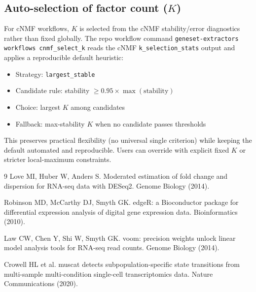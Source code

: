 \documentclass[11pt]{article}
\begin{document}
\subsection*{Auto-selection of factor count ($K$)}
For cNMF workflows, $K$ is selected from the cNMF stability/error diagnostics rather than fixed globally.
The repo workflow command \texttt{geneset-extractors workflows cnmf\_select\_k} reads the cNMF
\texttt{k\_selection\_stats} output and applies a reproducible default heuristic:
\begin{itemize}[leftmargin=2em]
\item Strategy: \texttt{largest\_stable}
\item Candidate rule: stability $\ge 0.95 \times \max(\text{stability})$
\item Choice: largest $K$ among candidates
\item Fallback: max-stability $K$ when no candidate passes thresholds
\end{itemize}
This preserves practical flexibility (no universal single criterion) while keeping the default automated and reproducible.
Users can override with explicit fixed $K$ or stricter local-maximum constraints.

\begin{thebibliography}{9}
Love MI, Huber W, Anders S.
Moderated estimation of fold change and dispersion for RNA-seq data with DESeq2.
Genome Biology (2014).

Robinson MD, McCarthy DJ, Smyth GK.
edgeR: a Bioconductor package for differential expression analysis of digital gene expression data.
Bioinformatics (2010).

Law CW, Chen Y, Shi W, Smyth GK.
voom: precision weights unlock linear model analysis tools for RNA-seq read counts.
Genome Biology (2014).

Crowell HL et al.
muscat detects subpopulation-specific state transitions from multi-sample multi-condition single-cell transcriptomics data.
Nature Communications (2020).
\end{thebibliography}
\end{document}
